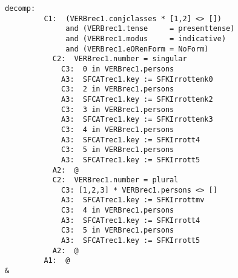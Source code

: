 \begin{verbatim}
decomp:
         C1:  (VERBrec1.conjclasses * [1,2] <> []) 
              and (VERBrec1.tense     = presenttense)
              and (VERBrec1.modus     = indicative) 
              and (VERBrec1.eORenForm = NoForm)
           C2:  VERBrec1.number = singular
             C3:  0 in VERBrec1.persons 
             A3:  SFCATrec1.key := SFKIrrottenk0
             C3:  2 in VERBrec1.persons 
             A3:  SFCATrec1.key := SFKIrrottenk2
             C3:  3 in VERBrec1.persons 
             A3:  SFCATrec1.key := SFKIrrottenk3
             C3:  4 in VERBrec1.persons 
             A3:  SFCATrec1.key := SFKIrrott4
             C3:  5 in VERBrec1.persons 
             A3:  SFCATrec1.key := SFKIrrott5
           A2:  @
           C2:  VERBrec1.number = plural
             C3: [1,2,3] * VERBrec1.persons <> []
             A3:  SFCATrec1.key := SFKIrrottmv
             C3:  4 in VERBrec1.persons 
             A3:  SFCATrec1.key := SFKIrrott4
             C3:  5 in VERBrec1.persons 
             A3:  SFCATrec1.key := SFKIrrott5
           A2:  @
         A1:  @
&
\end{verbatim}
\newpage
